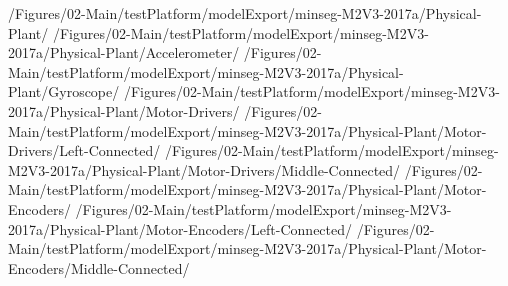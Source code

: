 {             {\main/Figures/02-Main/testPlatform/modelExport/minseg-M2V3-2017a/Physical-Plant/}
             {\main/Figures/02-Main/testPlatform/modelExport/minseg-M2V3-2017a/Physical-Plant/Accelerometer/}
             {\main/Figures/02-Main/testPlatform/modelExport/minseg-M2V3-2017a/Physical-Plant/Gyroscope/}
             {\main/Figures/02-Main/testPlatform/modelExport/minseg-M2V3-2017a/Physical-Plant/Motor-Drivers/}
             {\main/Figures/02-Main/testPlatform/modelExport/minseg-M2V3-2017a/Physical-Plant/Motor-Drivers/Left-Connected/}
             {\main/Figures/02-Main/testPlatform/modelExport/minseg-M2V3-2017a/Physical-Plant/Motor-Drivers/Middle-Connected/}
             {\main/Figures/02-Main/testPlatform/modelExport/minseg-M2V3-2017a/Physical-Plant/Motor-Encoders/}
             {\main/Figures/02-Main/testPlatform/modelExport/minseg-M2V3-2017a/Physical-Plant/Motor-Encoders/Left-Connected/}
             {\main/Figures/02-Main/testPlatform/modelExport/minseg-M2V3-2017a/Physical-Plant/Motor-Encoders/Middle-Connected/}
             }

